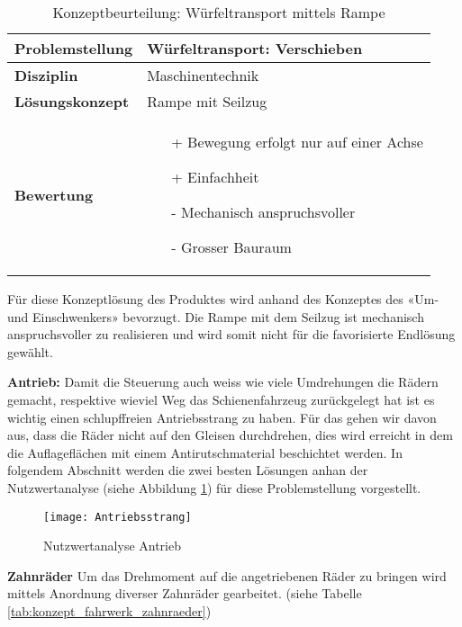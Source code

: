 \documentclass[../../main.tex]{subfiles}
\begin{document}
\begin{flushleft}
    \begin{table}[h]
    \begin{tabular}{ | l | p{11cm} |}
    \hline
    \textbf{Problemstellung} & Würfeltransport: Verschieben \\ \hline
    \textbf{Disziplin} & Maschinentechnik \\ \hline
    \textbf{Lösungskonzept} &  Rampe mit Seilzug \\ \hline
    \textbf{Bewertung} &  \begin{itemize}
                            \item[+] Bewegung erfolgt nur auf einer Achse
                            \item[+] Einfachheit
                            \item[-] Mechanisch anspruchsvoller
                            \item[-] Grosser Bauraum
                          \end{itemize} \\ \hline
    \end{tabular}
    \caption{Konzeptbeurteilung: Würfeltransport mittels Rampe}
    \label{tab:konzept_wurfeltrransport_umschwenker}
\end{table}
\end{flushleft}
Für diese Konzeptlösung des Produktes wird anhand des Konzeptes des «Um- und Einschwenkers» bevorzugt. Die Rampe mit dem Seilzug ist mechanisch anspruchsvoller zu realisieren und wird somit nicht für die favorisierte Endlösung gewählt.

\textbf{Antrieb:}
Damit die Steuerung auch weiss wie viele Umdrehungen die Rädern gemacht, respektive wieviel Weg das Schienenfahrzeug zurückgelegt hat ist es wichtig einen schlupffreien Antriebsstrang zu haben. Für das gehen wir davon aus, dass die Räder nicht auf den Gleisen durchdrehen, dies wird erreicht in dem die Auflageflächen mit einem Antirutschmaterial beschichtet werden. In folgendem Abschnitt werden die zwei besten Lösungen anhan der Nutzwertanalyse (siehe Abbildung \ref{fig:antrieb}) für diese Problemstellung vorgestellt.

\begin{figure}[H] %
    \centering
    \texttt{[image: Antriebsstrang]}
    \caption{Nutzwertanalyse Antrieb}
    \label{fig:antrieb}
\end{figure}

\textbf{Zahnräder}
Um das Drehmoment auf die angetriebenen Räder zu bringen wird mittels Anordnung diverser Zahnräder gearbeitet. (siehe Tabelle \ref{tab:konzept_fahrwerk_zahnraeder})
\end{document}
